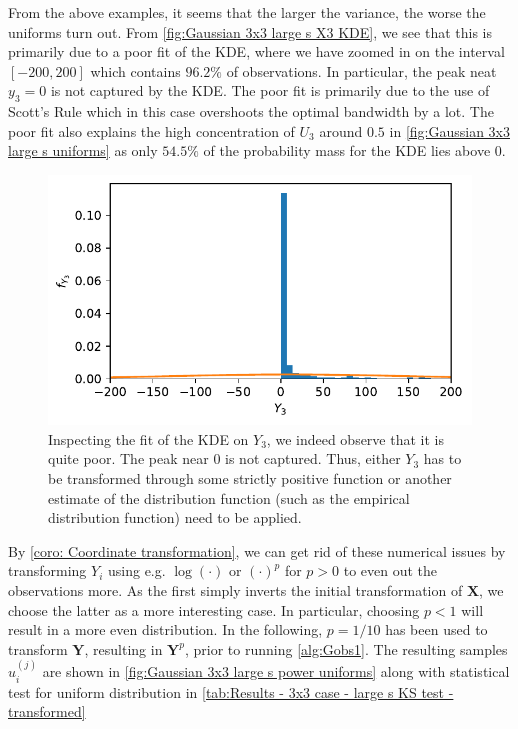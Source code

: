 \documentclass[../Thesis.tex]{subfiles}
\begin{document}
From the above examples, it seems that the larger the variance, the worse the uniforms turn out. From \autoref{fig:Gaussian 3x3 large s X3 KDE}, we see that this is primarily due to a poor fit of the KDE, where we have zoomed in on the interval $[-200, 200]$ which contains $96.2\%$ of observations. In particular, the peak neat $y_3 = 0$ is not captured by the KDE. The poor fit is primarily due to the use of Scott's Rule which in this case overshoots the optimal bandwidth by a lot. The poor fit also explains the high concentration of $U_3$ around $0.5$ in \autoref{fig:Gaussian 3x3 large s uniforms} as only $54.5\%$ of the probability mass for the KDE lies above $0$.
\begin{figure}[H]
    \centering
    \includegraphics[width=0.7\linewidth]{figures/ND examples/Gaussian 3x3 large s X3 KDE.pdf}
    \caption{Inspecting the fit of the KDE on $Y_3$, we indeed observe that it is quite poor. The peak near $0$ is not captured. Thus, either $Y_3$ has to be transformed through some strictly positive function or another estimate of the distribution function (such as the empirical distribution function) need to be applied.}
    \label{fig:Gaussian 3x3 large s X3 KDE}
\end{figure}

By \autoref{coro: Coordinate transformation}, we can get rid of these numerical issues by transforming $Y_i$ using e.g. $\log(\cdot)$ or $(\cdot)^{p}$ for $p>0$ to even out the observations more. As the first simply inverts the initial transformation of $\boldsymbol X$, we choose the latter as a more interesting case. In particular, choosing $p<1$ will result in a more even distribution. In the following, $p=1/10$ has been used to transform $\boldsymbol Y$, resulting in $\boldsymbol Y^p$, prior to running \autoref{alg:Gobs1}. The resulting samples $u_i^{(j)}$ are shown in \autoref{fig:Gaussian 3x3 large s power uniforms} along with statistical test for uniform distribution in \autoref{tab:Results - 3x3 case - large s KS test - transformed}
\end{document}
